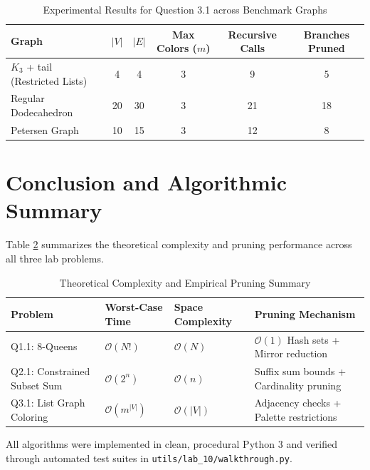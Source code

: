 \documentclass[12pt]{article}
\begin{document}
\begin{table}[H]
\centering
\caption{Experimental Results for Question 3.1 across Benchmark Graphs}
\label{tab:graph_coloring}
\begin{tabular}{lccccc}
\toprule
\textbf{Graph} & $|V|$ & $|E|$ & \textbf{Max Colors ($m$)} & \textbf{Recursive Calls} & \textbf{Branches Pruned} \\
\midrule
$K_3$ + tail (Restricted Lists) & 4 & 4 & 3 & 9 & 5 \\
Regular Dodecahedron & 20 & 30 & 3 & 21 & 18 \\
Petersen Graph & 10 & 15 & 3 & 12 & 8 \\
\bottomrule
\end{tabular}
\end{table}

\vspace{0.4cm}

\section*{Conclusion and Algorithmic Summary}
Table \ref{tab:complexity_summary} summarizes the theoretical complexity and pruning performance across all three lab problems.

\begin{table}[H]
\centering
\caption{Theoretical Complexity and Empirical Pruning Summary}
\label{tab:complexity_summary}
\begin{tabular}{lllp{6.2cm}}
\toprule
\textbf{Problem} & \textbf{Worst-Case Time} & \textbf{Space Complexity} & \textbf{Pruning Mechanism} \\
\midrule
Q1.1: 8-Queens & $\mathcal{O}(N!)$ & $\mathcal{O}(N)$ & $\mathcal{O}(1)$ Hash sets + Mirror reduction \\
Q2.1: Constrained Subset Sum & $\mathcal{O}(2^n)$ & $\mathcal{O}(n)$ & Suffix sum bounds + Cardinality pruning \\
Q3.1: List Graph Coloring & $\mathcal{O}(m^{|V|})$ & $\mathcal{O}(|V|)$ & Adjacency checks + Palette restrictions \\
\bottomrule
\end{tabular}
\end{table}

All algorithms were implemented in clean, procedural Python 3 and verified through automated test suites in \texttt{utils/lab\_10/walkthrough.py}.
\end{document}
